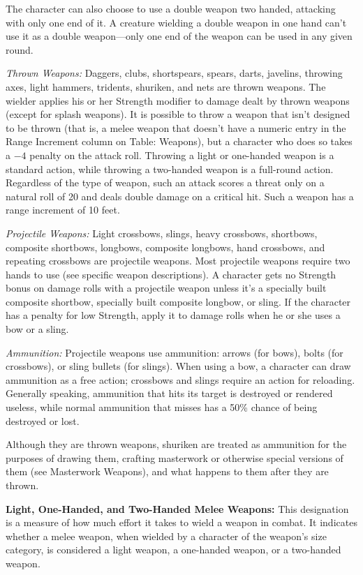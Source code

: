The character can also choose to use a double weapon two handed, attacking with only one end of it. A creature wielding a double weapon in one hand can't use it as a double weapon---only one end of the weapon can be used in any given round.

\textit{Thrown Weapons:} Daggers, clubs, shortspears, spears, darts, javelins, throwing axes, light hammers, tridents, shuriken, and nets are thrown weapons. The wielder applies his or her Strength modifier to damage dealt by thrown weapons (except for splash weapons). It is possible to throw a weapon that isn't designed to be thrown (that is, a melee weapon that doesn't have a numeric entry in the Range Increment column on Table: Weapons), but a character who does so takes a $-4$ penalty on the attack roll. Throwing a light or one-handed weapon is a standard action, while throwing a two-handed weapon is a full-round action. Regardless of the type of weapon, such an attack scores a threat only on a natural roll of 20 and deals double damage on a critical hit. Such a weapon has a range increment of 10 feet.

\textit{Projectile Weapons:} Light crossbows, slings, heavy crossbows, shortbows, composite shortbows, longbows, composite longbows, hand crossbows, and repeating crossbows are projectile weapons. Most projectile weapons require two hands to use (see specific weapon descriptions). A character gets no Strength bonus on damage rolls with a projectile weapon unless it's a specially built composite shortbow, specially built composite longbow, or sling. If the character has a penalty for low Strength, apply it to damage rolls when he or she uses a bow or a sling.

\textit{Ammunition:} Projectile weapons use ammunition: arrows (for bows), bolts (for crossbows), or sling bullets (for slings). When using a bow, a character can draw ammunition as a free action; crossbows and slings require an action for reloading. Generally speaking, ammunition that hits its target is destroyed or rendered useless, while normal ammunition that misses has a 50\% chance of being destroyed or lost.

Although they are thrown weapons, shuriken are treated as ammunition for the purposes of drawing them, crafting masterwork or otherwise special versions of them (see Masterwork Weapons), and what happens to them after they are thrown.

\textbf{Light, One-Handed, and Two-Handed Melee Weapons:} This designation is a measure of how much effort it takes to wield a weapon in combat. It indicates whether a melee weapon, when wielded by a character of the weapon's size category, is considered a light weapon, a one-handed weapon, or a two-handed weapon.

